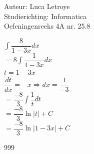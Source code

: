 \documentclass[a4paper]{article}
\begin{document}
  
\noindent \large Auteur: Luca Letroye \\
\noindent \large Studierichting: Informatica\\
\noindent \large Oefeningenreeks 4A nr. 25.8

\medskip
\normalsize

$\displaystyle\int \dfrac{8}{1-3x}dx $\\

$ = 8\displaystyle\int \dfrac{1}{1-3x}dx $\\

$t = 1-3x$\\

$\dfrac{dt}{dx} = -x \Rightarrow dx = \dfrac{1}{-3}$\\

$ = \dfrac{-8}{3}\displaystyle\int \dfrac{1}{t}dt $\\

$ = \dfrac{-8}{3} \ln|t| +C \ $\\

$ = \dfrac{-8}{3} \ln|1-3x| +C \ $\\



\begin{thebibliography}{999}
\end{thebibliography}
\end{document}
